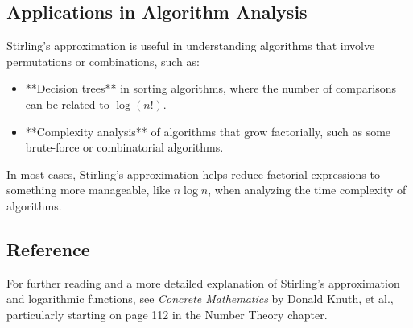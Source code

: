 \documentclass{article}
\begin{document}
\subsection{Applications in Algorithm Analysis}
Stirling's approximation is useful in understanding algorithms that involve permutations or combinations, such as:
\begin{itemize}
    \item **Decision trees** in sorting algorithms, where the number of comparisons can be related to \( \log(n!) \).
    \item **Complexity analysis** of algorithms that grow factorially, such as some brute-force or combinatorial algorithms.
\end{itemize}
In most cases, Stirling's approximation helps reduce factorial expressions to something more manageable, like \( n \log n \), when analyzing the time complexity of algorithms.

\subsection{Reference}
For further reading and a more detailed explanation of Stirling's approximation and logarithmic functions, see \textit{Concrete Mathematics} by Donald Knuth, et al., particularly starting on page 112 in the Number Theory chapter.
\end{document}

